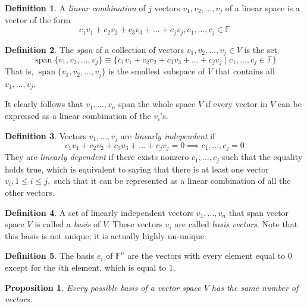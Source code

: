 \documentclass{article}
\DeclareMathOperator{\Span}{span}
\newtheorem{proposition}[theorem]{Proposition}
\theoremstyle{remark}
\theoremstyle{definition}
\newtheorem{definition}{Definition}[section]
\begin{document}
    \begin{definition}
    A \textit{linear combination} of $j$ vectors $v_1, v_2, ..., v_j$ of a linear space is a vector of the form 
    \begin{equation}
        c_1 v_1 + c_2 v_2 + c_3 v_3 + ... + c_j v_j, c_1, ..., c_j \in \mathbb{F}
    \end{equation}
    \end{definition}

    \begin{definition}
    The \textit{span} of a collection of vectors $v_1, v_2, ..., v_j \in V$ is the set
    \[\Span \{ v_1, v_2, ..., v_j \} \equiv \{ c_1 v_1 + c_2 v_2 + c_3 v_3 + ... + c_j v_j\; | \; c_1, ..., c_j \in \mathbb{F}\} \]
    That is, $\Span \{v_1, v_2, ..., v_j\}$ is the smallest subspace of $V$ that contains all $v_1, ..., v_j$. 
    \end{definition}

    It clearly follows that $v_1, ..., v_n$ span the whole space $V$ if every vector in $V$ can be expressed as a linear combination of the $v_i$'s. 

    \begin{definition}
    Vectors $v_1, ..., v_j$ are \textit{linearly independent} if 
    \[ c_1 v_1 + c_2 v_2 + c_3 v_3 + ... + c_j v_j = 0 \implies c_1, ..., c_j = 0\]
    They are \textit{linearly dependent} if there exists nonzero $c_1, ..., c_j$ such that the equality holds true, which is equivalent to saying that there is at least one vector $v_i, 1 \leq i \leq j,$ such that it can be represented as a linear combination of all the other vectors. 
    \end{definition}

    \begin{definition}
    A set of linearly independent vectors $v_1, ..., v_n$ that span vector space $V$ is called a \textit{basis} of $V$. These vectors $v_i$ are called \textit{basis vectors}. Note that this basis is not unique; it is actually highly un-unique. 
    \end{definition}




    \begin{definition}
    The basis $e_i$ of $\mathbb{F}^n$ are the vectors with every element equal to $0$ except for the $i$th element, which is equal to $1$. 
    \end{definition}

    \begin{proposition}
    Every possible basis of a vector space $V$ has the same number of vectors.
    \end{proposition}
\end{document}
